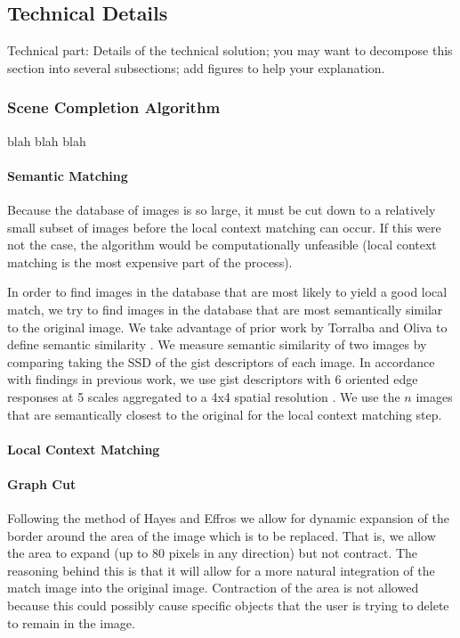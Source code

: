 \documentclass[11pt]{amsart}
\begin{document}
\subsection{Technical Details}
Technical part: Details of the technical solution; you may want to decompose this section into several subsections; add figures to help your explanation. 
\subsubsection{Scene Completion Algorithm}
blah blah blah

\paragraph{\sc Semantic Matching} 

Because the database of images is so large, it must be cut down to a relatively small subset of images before the local context matching can occur. If this were not the case, the algorithm would be computationally unfeasible (local context matching is the most expensive part of the process). 

In order to find images in the database that are most likely to yield a good local match, we try to find images in the database that are most semantically similar to the original image. We take advantage of prior work by Torralba and Oliva to define semantic similarity \cite{Torralba:2006}. We measure semantic similarity of two images by comparing taking the SSD of the gist descriptors of each image. In accordance with findings in previous work, we use gist descriptors with 6 oriented edge responses at 5 scales aggregated to a
4x4 spatial resolution \cite{Hays:2007}. We use the $n$ images that are semantically closest to the original
for the local context matching step. 

\paragraph{\sc Local Context Matching}

\paragraph{\sc Graph Cut}

Following the method of Hayes and Effros \cite{Hays:2007} we allow for dynamic expansion of the border around the area of the image which is to be replaced. That is, we allow the area to expand (up to 80 pixels in any direction) but not contract. The reasoning behind this is that it will allow for a more natural integration of the match image into the original image. Contraction of the area is not allowed because this could possibly cause specific objects that the user is trying to delete to remain in the image. 
\end{document}
